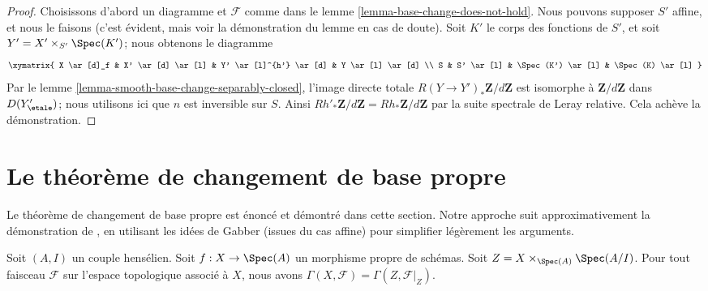 \begin{proof}
Choisissons d'abord un diagramme et $\mathcal{F}$ comme dans le
lemme \ref{lemma-base-change-does-not-hold}.
Nous pouvons supposer $S'$ affine, et nous le faisons (c'est évident, mais
voir la démonstration du lemme en cas de doute).
Soit $K'$ le corps des fonctions de $S'$,
et soit $Y' = X' \times_{S'} \Spec(K')$; nous obtenons le diagramme
$$
\xymatrix{
X \ar[d]_f &
X' \ar[d] \ar[l] &
Y' \ar[l]^{h'} \ar[d] &
Y \ar[l] \ar[d] \\
S &
S' \ar[l] &
\Spec(K') \ar[l] &
\Spec(K) \ar[l]
}
$$
Par le lemme \ref{lemma-smooth-base-change-separably-closed},
l'image directe totale $R(Y \to Y')_*\mathbf{Z}/d\mathbf{Z}$
est isomorphe à $\mathbf{Z}/d\mathbf{Z}$ dans $D(Y'_\etale)$; nous
utilisons ici que $n$ est inversible sur $S$.
Ainsi $Rh'_*\mathbf{Z}/d\mathbf{Z} = Rh_*\mathbf{Z}/d\mathbf{Z}$
par la suite spectrale de Leray relative. Cela achève la démonstration.
\end{proof}










\section{Le théorème de changement de base propre}
\label{section-proper-base-change}

\noindent
Le théorème de changement de base propre est énoncé et démontré dans cette section.
Notre approche suit approximativement la démonstration de \cite[XII, théorème 5.1]{SGA4},
en utilisant les idées de Gabber (issues du cas affine) pour simplifier
légèrement les arguments.

\begin{lemma}
\label{lemma-zariski-h0-proper-over-henselian-pair}
Soit $(A, I)$ un couple hensélien. Soit $f : X \to \Spec(A)$ un morphisme propre
de schémas. Soit $Z = X \times_{\Spec(A)} \Spec(A/I)$. Pour tout
faisceau $\mathcal{F}$ sur l'espace topologique associé à $X$, nous
avons $\Gamma(X, \mathcal{F}) = \Gamma(Z, \mathcal{F}|_Z)$.
\end{lemma}

